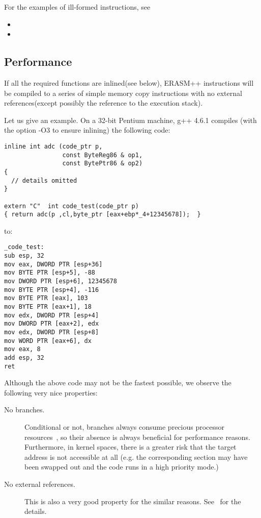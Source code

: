 \documentclass{article}
\begin{document}
For the examples of ill-formed instructions, see

\begin{itemize}
\item {}
\item {}
\end{itemize}

\subsection{Performance}

If all the required functions are inlined(see below), ERASM++
instructions will be compiled to a series of simple memory copy
instructions with no external references(except possibly the reference
to the execution stack).

Let us give an example. On a 32-bit Pentium machine, g++ 4.6.1 compiles
(with the option -O3 to ensure inlining) the following code:

\begin{lstlisting}[frame=single]
inline int adc (code_ptr p, 
                const ByteReg86 & op1,
                const BytePtr86 & op2)
{
  // details omitted
}

extern "C"  int code_test(code_ptr p)
{ return adc(p ,cl,byte_ptr [eax+ebp*_4+12345678]);  }
\end{lstlisting}
to:
\begin{lstlisting}[language={[x86masm]Assembler},frame=single]
_code_test:
sub	esp, 32
mov	eax, DWORD PTR [esp+36]
mov	BYTE PTR [esp+5], -88
mov	DWORD PTR [esp+6], 12345678
mov	BYTE PTR [esp+4], -116
mov	BYTE PTR [eax], 103
mov	BYTE PTR [eax+1], 18
mov	edx, DWORD PTR [esp+4]
mov	DWORD PTR [eax+2], edx
mov	edx, DWORD PTR [esp+8]
mov	WORD PTR [eax+6], dx
mov	eax, 8
add	esp, 32
ret
\end{lstlisting}

Although the above code may not be the fastest possible, we observe the
following very nice properties:

\begin{description}
\item[No branches.] Conditional or not, branches always consume
  precious processor resources~\cite{intel:opt_ref}, so their absence
  is always beneficial for performance reasons. Furthermore, in kernel
  spaces, there is a greater risk that the target address is not
  accessible at all (e.g. the corresponding section may have been
  swapped out and the code runs in a high priority mode.)

\item[No external references.] This is also a very good property for
  the similar reasons. See~\cite{intel:opt_ref} for the details.

\end{description}
\end{document}
